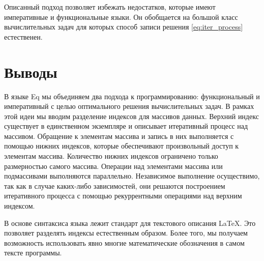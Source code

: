 \documentclass[a4paper]{llncs}
\begin{document}
Описанный подход позволяет избежать недостатков, которые имеют императивные и
функциональные языки. Он обобщается на большой класс вычислительных задач для
которых способ записи решения \eqref{eq:iter_process} естественен. 

\section*{Выводы}
В языке Eq мы объединяем два подхода к программированию: функциональный и
императивный с целью оптимального решения вычислительных задач. В рамках этой
идеи мы вводим разделение индексов для массивов данных. Верхний индекс
существует в единственном экземпляре и описывает итеративный процесс над
массивом. Обращение к элементам массива и запись в них выполняется с помощью
нижних индексов, которые обеспечивают произвольный доступ к элементам массива.
Количество нижних индексов ограничено только размерностью самого массива.
Операции над элементами массива или подмассивами выполняются параллельно.
Независимое выполнение осуществимо, так как в случае каких-либо зависимостей,
они решаются построением итеративного процесса с помощью рекуррентными
операциями над верхним индексом.

В основе синтаксиса языка лежит стандарт для текстового описания \LaTeX. Это
позволяет разделять индексы естественным образом. Более того, мы получаем
возможность использовать явно многие математические обозначения в самом тексте
программы.  
\end{document}
